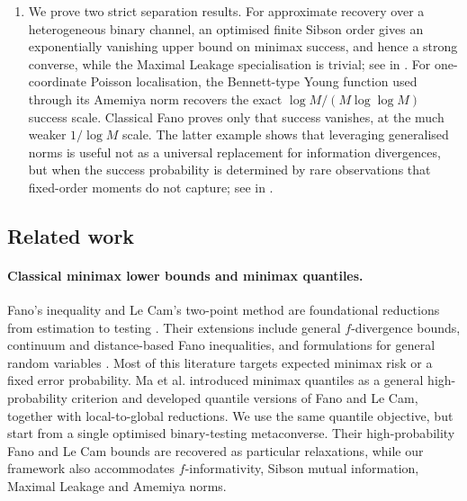 \documentclass[11pt]{article}
\theoremstyle{definition}
\theoremstyle{remark}
\newcommand{\1}{\boldsymbol{1}}
\begin{document}
\begin{enumerate}
\item We prove two strict separation results. For approximate recovery
over a heterogeneous binary channel, an optimised finite Sibson order
gives an exponentially vanishing upper bound on minimax success, and
hence a strong converse, while the Maximal Leakage specialisation is
trivial; see
in . For one-coordinate Poisson localisation, the Bennett-type Young
function used through its Amemiya norm recovers the exact
\(\log M/(M\log\log M)\) success scale. Classical Fano proves only that
success vanishes, at the much weaker \(1/\log M\) scale. The latter
example shows that leveraging generalised norms is useful not as a universal
replacement for information divergences, but when the success probability
is determined by rare observations that fixed-order moments do not capture;
see  in
.
\end{enumerate}

\subsection{Related work}

\paragraph{Classical minimax lower bounds and minimax quantiles.}
Fano's inequality and Le Cam's two-point method are foundational
reductions from estimation to testing
\cite{Fano1961,LeCam1973,Yu1997,Wainwright2019}. Their extensions include
general \(f\)-divergence bounds, continuum and distance-based Fano
inequalities, and formulations for general random variables
\cite{Gushchin2003,Guntuboyina2011,DuchiWainwright2013,
GerchinovitzMenardStoltz2020}. Most of this literature targets expected
minimax risk or a fixed error probability. Ma et al.
\cite{MaVerchandSamworth2024} introduced minimax quantiles as a general
high-probability criterion and developed quantile versions of Fano and
Le Cam, together with local-to-global reductions. We use the same
quantile objective, but start from a single optimised binary-testing
metaconverse. Their high-probability Fano and Le Cam bounds are recovered
as particular relaxations, while our framework also accommodates
\(f\)-informativity, Sibson mutual information, Maximal Leakage and Amemiya norms.
\end{document}
